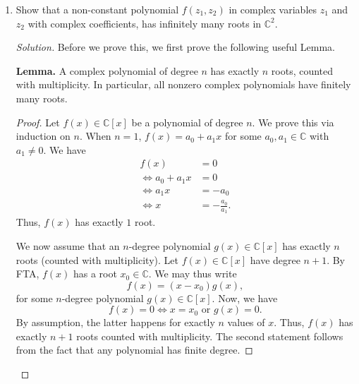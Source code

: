 \documentclass[11pt]{article}
\theoremstyle{definition}
\newenvironment{blockquote}
{\begin{mdframed}[skipabove=0pt, skipbelow=0pt, innertopmargin=4pt, innerbottommargin=4pt, bottomline=false,topline=false,rightline=false, linewidth=2pt]}
{\end{mdframed}}
\newenvironment{soln}{\begin{proof}[Solution]}{\end{proof}}
\begin{document}
\begin{enumerate}[leftmargin=*]
\begin{soln}
		Thus, $x_0$ and $\overline{x_0}$ are two distinct roots of $f(x)$. Define $g(x) \vcentcolon= (x-x_0)(x-\overline{x_0})$. A priori, we have $g(x) \in \mathbb{C}[x]$. However, note that
		\[
		    (x-x_0)(x-\overline{x_0}) = x^2 - (2\mathfrak{R}x_0)x + \abs{x_0}^2 \in \mathbb{R}[x].
		\]
		Thus, $g(x)$ is in fact a real polynomial. Since $x_0$ and $\overline{x_0}$ are distinct, we see that $g(x)$ divides $f(x)$ in $\mathbb{C}[x]$. (Why?) Thus,
		\[
		    f(x) = g(x) h(x)
		\]
		for some $h(x) \in \mathbb{C}[x]$. Again, since $f(x)$ and $g(x)$ are both real polynomials, so is $f=h(x)$. Moreover, since $\deg f(x) \geq 3$ and $\deg g(x) = 2$, we have $\deg h(x) \geq 1$, and we are done. \qedhere

    \end{soln}
    
    \item Show that a non-constant polynomial $f(z_1, z_2)$ in complex variables $z_1$ and $z_2$ with complex coefficients, has infinitely many roots in $\mathbb{C}^2$.
    
    \begin{soln}
        Before we prove this, we first prove the following useful Lemma.
        
        \medskip
        
        \begin{blockquote}
			\textbf{Lemma.} A complex polynomial of degree $n$ has exactly $n$ roots, counted with multiplicity. In particular, all nonzero complex polynomials have finitely many roots. 
			\begin{proof} 
				Let $f(x) \in \mathbb{C}[x]$ be a polynomial of degree $n$. We prove this via induction on $n$. When $n = 1$, $f(x) = a_0 + a_1x$ for some $a_0,a_1 \in \mathbb{C}$ with $a_1 \neq 0$. We have
				\begin{align*}
				    f(x) &= 0 \\
				    \iff a_0 + a_1 x &= 0 \\
				    \iff a_1x &= -a_0 \\
				    \iff x &= -\frac{a_0}{a_1}.
				\end{align*}
				Thus, $f(x)$ has exactly $1$ root. 
				
				We now assume that an $n$-degree polynomial $g(x) \in \mathbb{C}[x]$ has exactly $n$ roots (counted with multiplicity). Let $f(x) \in \mathbb{C}[x]$ have degree $n+1$. By FTA, $f(x)$ has a root $x_0 \in \mathbb{C}$. We may thus write
				\[
				    f(x) = (x-x_0)g(x),
				\]
				for some $n$-degree polynomial $g(x) \in \mathbb{C}[x]$. Now, we have
				\[
				    f(x) = 0 \iff x = x_0 \text{ or } g(x) = 0.
				\]
				By assumption, the latter happens for exactly $n$ values of $x$. Thus, $f(x)$ has exactly $n+1$ roots counted with multiplicity. The second statement follows from the fact that any polynomial has finite degree.
			\end{proof}
		\end{blockquote}
        

\end{soln}
\end{enumerate}
\end{document}
